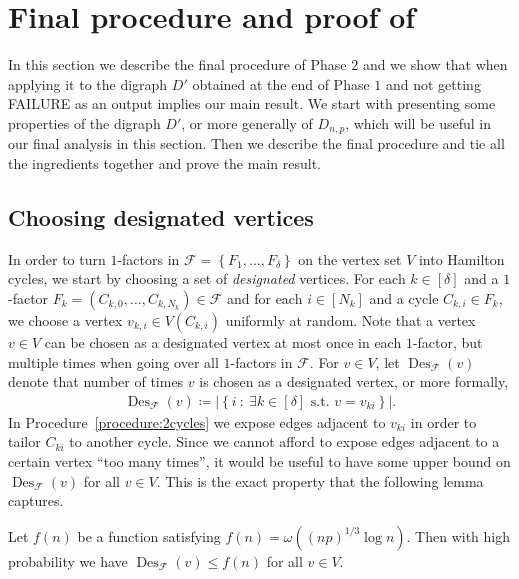 \documentclass{article}
\DeclareMathOperator{\Des}{Des}
\begin{document}
	
	\section{\texorpdfstring{Final procedure and proof of }{Final Procedure and proof of Theorem 1.1}}
	
	In this section we describe the final procedure of Phase $2$ and we show that when applying it to the digraph $D'$ obtained at the end of Phase $1$ and not getting FAILURE as an output implies our main result.
	We start with presenting some properties of the digraph $D'$, or more generally of $D_{n,p}$, which will be useful in our final analysis in this section.
	Then we describe the final procedure and tie all the ingredients together and prove the main result.
	
	
	\subsection{Choosing designated vertices}
	\label{sec:desvxs}
	In order to turn $1$-factors in $\mathcal{F} = \left\{F_1, \ldots, F_{\delta} \right\}$ on the vertex set $V$ into Hamilton cycles, we start by choosing a set of \emph{designated} vertices.
	For each $k \in [\delta]$ and a $1$-factor $F_k = (C_{k,0}, \ldots, C_{k,N_k}) \in \mathcal F$ and for each $i \in [N_k]$ and a cycle $C_{k,i} \in F_k$, we choose a vertex $v_{k,i} \in V(C_{k,i})$ uniformly at random.
	Note that a vertex $v \in V$ can be chosen as a designated vertex at most once in each $1$-factor, but multiple times when going over all $1$-factors in $\mathcal F$.
	For $v \in V$, let $\Des_{\mathcal F}(v)$ denote that number of times $v$ is chosen as a designated vertex, or more formally,
	\begin{align*}
	\Des_{\mathcal F}(v) \coloneqq \left|\left\{i ~:~ \exists k \in [\delta] \text{ s.t. } v = v_{ki} \right\} \right|.
	\end{align*}
	In Procedure~\ref{procedure:2cycles} we expose edges adjacent to $v_{ki}$ in order to tailor $C_{ki}$ to another cycle.
	Since we cannot afford to expose edges adjacent to a certain vertex ``too many times'', it would be useful to have some upper bound on $\Des_{\mathcal F}(v)$ for all $v \in V$.
	This is the exact property that the following lemma captures. 
	
	\begin{lemma}
		\label{lem:keygnrl}
		Let $f(n)$ be a function satisfying $f(n) = \omega\left((np)^{1/3} \log n \right)$.
		Then with high probability we have $\Des_{\mathcal F}(v) \le f(n)$ for all $v \in V$.
	\end{lemma}
	
\end{document}
